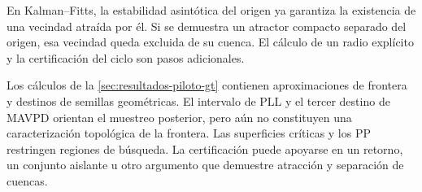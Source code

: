 En Kalman--Fitts, la estabilidad asintótica del origen ya garantiza la
existencia de una vecindad atraída por él. Si se demuestra un atractor
compacto separado del origen, esa vecindad queda excluida de su cuenca. El
cálculo de un radio explícito y la certificación del ciclo son pasos
adicionales.

Los cálculos de la \cref{sec:resultados-piloto-gt} contienen aproximaciones
de frontera y destinos de semillas geométricas. El intervalo de PLL y el
tercer destino de MAVPD orientan el muestreo posterior, pero aún no constituyen
una caracterización topológica de la frontera. Las superficies críticas y
los PP restringen regiones de búsqueda. La certificación puede apoyarse en
un retorno, un conjunto aislante u otro argumento que demuestre atracción
y separación de cuencas.

